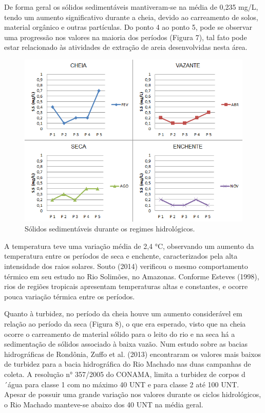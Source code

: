 \documentclass[article,12pt,onesidea,4paper,english,brazil]{abntex2}
\begin{document}
De forma geral os sólidos sedimentáveis mantiveram-se na média de 0,235 mg/L, tendo um aumento significativo durante a cheia, devido ao carreamento de solos, material orgânico e outras partículas. Do ponto 4 ao ponto 5, pode se observar uma progressão nos valores na maioria dos períodos (Figura 7), tal fato pode estar relacionado às atividades de extração de areia desenvolvidas nesta área.

\begin{figure}[!h]
	\centering
	\includegraphics[width=0.8\linewidth]{pip-137-07}
	\caption{Sólidos sedimentáveis durante os regimes hidrológicos.}
\end{figure}

A temperatura teve uma variação média de 2,4 °C, observando um aumento da temperatura entre os períodos de seca e enchente, caracterizados pela alta intensidade dos raios solares. Souto (2014) verificou o mesmo comportamento térmico em seu estudo no Rio Solimões, no Amazonas. Conforme Esteves (1998), rios de regiões tropicais apresentam temperaturas altas e constantes, e ocorre pouca variação térmica entre os períodos.

Quanto à turbidez, no período da cheia houve um aumento considerável em relação ao período da seca (Figura 8), o que era esperado, visto que na cheia ocorre o carreamento de material sólido para o leito do rio e na seca há a sedimentação de sólidos associado à baixa vazão. Num estudo sobre as bacias hidrográficas de Rondônia, Zuffo et al. (2013) encontraram os valores mais baixos de turbidez para a bacia hidrográfica do Rio Machado nas duas campanhas de coleta. A resolução n° 357/2005 do CONAMA, limita a turbidez de corpos d´água para classe 1 com no máximo 40 UNT e para classe 2 até 100 UNT. Apesar de possuir uma grande variação nos valores durante os ciclos hidrológicos, o Rio Machado manteve-se abaixo dos 40 UNT na média geral.
\end{document}

